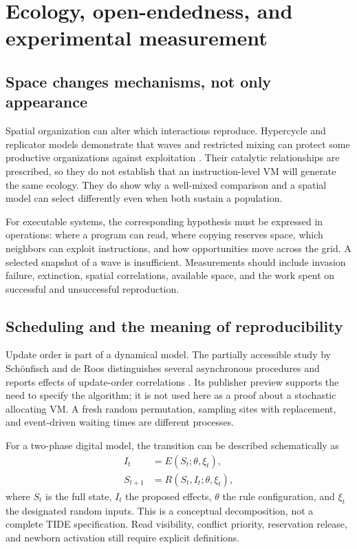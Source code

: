 \section{Ecology, open-endedness, and experimental measurement}
\subsection{Space changes mechanisms, not only appearance}
Spatial organization can alter which interactions reproduce. Hypercycle and
replicator models demonstrate that waves and restricted mixing can protect
some productive organizations against exploitation
\citep{Boerlijst1991,Takeuchi2009}. Their catalytic relationships are prescribed,
so they do not establish that an instruction-level VM will generate the same
ecology. They do show why a well-mixed comparison and a spatial model can
select differently even when both sustain a population.

For executable systems, the corresponding hypothesis must be expressed in
operations: where a program can read, where copying reserves space, which
neighbors can exploit instructions, and how opportunities move across the
grid. A selected snapshot of a wave is insufficient. Measurements should
include invasion failure, extinction, spatial correlations, available space,
and the work spent on successful and unsuccessful reproduction.

\subsection{Scheduling and the meaning of reproducibility}
Update order is part of a dynamical model. The partially accessible study by
Sch\"onfisch and de Roos distinguishes several asynchronous procedures and
reports effects of update-order correlations \citep{Schonfisch1999}. Its
publisher preview supports the need to specify the algorithm; it is not used
here as a proof about a stochastic allocating VM. A fresh random permutation,
sampling sites with replacement, and event-driven waiting times are different
processes.

For a two-phase digital model, the transition can be described schematically as
\begin{align}
 I_t &= E(S_t;\theta,\xi_t),\\
 S_{t+1} &= R(S_t,I_t;\theta,\xi_t),
\end{align}
where $S_t$ is the full state, $I_t$ the proposed effects, $\theta$ the rule
configuration, and $\xi_t$ the designated random inputs. This is a conceptual
decomposition, not a complete TIDE specification. Read visibility, conflict
priority, reservation release, and newborn activation still require explicit
definitions.

